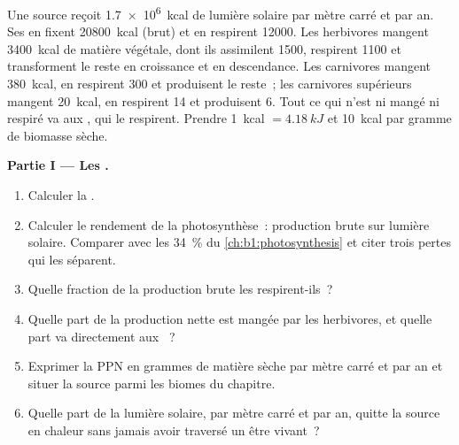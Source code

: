 \begin{problem}
\label{pb:b1:ecosystem-organization:1}
Une source reçoit \qty{1.7e6}{kcal} de lumière solaire par mètre carré
et par an. Ses  en fixent \qty{20800}{kcal} (brut) et en
respirent \qty{12000}{}. Les herbivores mangent \qty{3400}{kcal} de
matière végétale, dont ils assimilent \qty{1500}{}, respirent
\qty{1100}{} et transforment le reste en croissance et en descendance.
Les carnivores mangent \qty{380}{kcal}, en respirent \qty{300}{} et
produisent le reste~; les carnivores supérieurs mangent \qty{20}{kcal},
en respirent \qty{14}{} et produisent \qty{6}{}. Tout ce qui n'est ni
mangé ni respiré va aux , qui le respirent. Prendre
\qty{1}{kcal} $= \qty{4.18}{kJ}$ et \qty{10}{kcal} par gramme de
biomasse sèche.

\medskip
\noindent\textbf{Partie I --- Les .}
\begin{enumerate}
  \item Calculer la .
  \item Calculer le rendement de la photosynthèse~: production brute
        sur lumière solaire. Comparer avec les \qty{34}{\%} du
        \cref{ch:b1:photosynthesis} et citer trois pertes qui les
        séparent.
  \item Quelle fraction de la production brute les 
        respirent-ils~?
  \item Quelle part de la production nette est mangée par les
        herbivores, et quelle part va directement aux ~?
  \item Exprimer la PPN en grammes de matière sèche par mètre carré et
        par an et situer la source parmi les biomes du chapitre.
  \item Quelle part de la lumière solaire, par mètre carré et par an,
        quitte la source en chaleur sans jamais avoir traversé un être
        vivant~?
\end{enumerate}


\end{problem}
